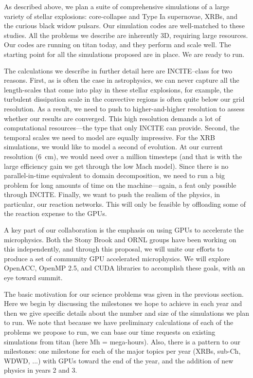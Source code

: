 As described above, we plan a suite of comprehensive simulations of a
large variety of stellar explosions: core-collapse and Type Ia
supernovae, XRBs, and the curious black widow pulsars.  Our simulation
codes are well-matched to these studies.  
All the problems we
describe are inherently 3D, requiring large resources.
Our codes are running on titan today, and they perform and scale
well.  The starting point for all the simulations proposed are in
place.  We are ready to run.

The calculations we describe in further detail here are INCITE--class 
for two reasons.  First, as is often the case in astrophysics, we can
never capture all the length-scales that come into play in these
stellar explosions, for example, the turbulent dissipation scale in
the convective regions is often quite below our grid resolution.  As a
result, we need to push to higher-and-higher resolution to assess
whether our results are converged.  This high resolution demands a lot
of computational resources---the type that only INCITE can provide.
Second, the temporal scales we need to model are equally impressive.
For the XRB simulations, we would like to model a second of evolution.
At our current resolution (6~cm), we would need over a million
timesteps (and that is with the large efficiency gain we get through
the low Mach model).  Since there is no parallel-in-time equivalent to
domain decomposition, we need to run a big problem for long amounts of
time on the machine---again, a feat only possible through INCITE.
Finally, we want to push the realism of the physics, in particular,
our reaction networks.  This will only be feasible by offloading some
of the reaction expense to the GPUs.

A key part of our collaboration is the emphasis on using GPUs
to accelerate the microphysics.  Both the Stony Brook and ORNL
groups have been working on this independently, and through this
proposal, we will unite our efforts to produce a set of community
GPU accelerated microphysics.  We will explore OpenACC, OpenMP 2.5,
and CUDA libraries to accomplish these goals, with an eye toward
summit.

The basic motivation for our science problems was given in the
previous section.  Here we begin by discussing the milestones we hope
to achieve in each year and then we give specific details about the
number and size of the simulations we plan to run.  We note that because
we have preliminary calculations of each of the problems we propose to
run, we can base our time requests on existing simulations from titan
(here Mh = mega-hours).  Also, there is a pattern to our milestones:
one milestone for each of the major topics per year (XRBs, sub-Ch,
WDWD, ...) with GPUs toward the end of the year, and the addition of 
new physics in years 2 and 3.  

